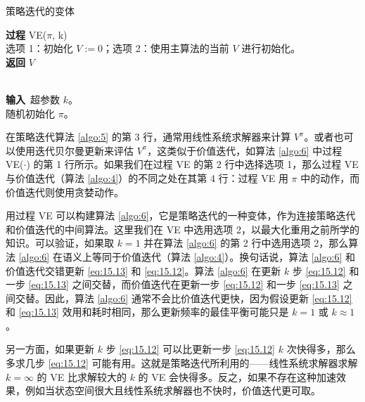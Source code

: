\vspace{0.5em}
\begin{algorithm}[H]
    \SetAlgoNoLine
    \label{algo:6}
    \caption{策略迭代的变体}
    \textbf{过程} VE($\pi$, k) \\
    \quad 选项 1：初始化 $V := 0$；选项 2：使用主算法的当前 $V$ 进行初始化。\\
    \quad {}
    \textbf{返回} $V$

    \ \\
    \textbf{输入}\ 超参数 $k$。\\
    随机初始化 $\pi$。\\
\end{algorithm}

在策略迭代算法 \ref{algo:5} 的第 3 行，通常用线性系统求解器来计算 $V^\pi$。或者也可以使用迭代贝尔曼更新来评估 $V^\pi$，这类似于价值迭代，如算法 \ref{algo:6} 中过程 VE($\cdot$) 的第 1 行所示。如果我们在过程 VE 的第 2 行中选择选项 1，那么过程 VE 与价值迭代（算法 \ref{algo:4}）的不同之处在其第 4 行：过程 VE 用 $\pi$ 中的动作，而价值迭代则使用贪婪动作。

用过程 VE 可以构建算法 \ref{algo:6}，它是策略迭代的一种变体，作为连接策略迭代和价值迭代的中间算法。这里我们在 VE 中选用选项 2，以最大化重用之前所学的知识。可以验证，如果取 $k=1$ 并在算法 \ref{algo:6} 的第 2 行中选用选项 2，那么算法 \ref{algo:6} 在语义上等同于价值迭代（算法 \ref{algo:4}）。换句话说，算法 \ref{algo:6} 和价值迭代交错更新 \eqref{eq:15.13} 和 \eqref{eq:15.12}。算法 \ref{algo:6} 在更新 $k$ 步 \eqref{eq:15.12} 和一步 \eqref{eq:15.13} 之间交替，而价值迭代在更新一步 \eqref{eq:15.12} 和一步 \eqref{eq:15.13} 之间交替。因此，算法 \ref{algo:6} 通常不会比价值迭代更快，因为假设更新 \eqref{eq:15.12} 和 \eqref{eq:15.13} 效用和耗时相同，那么更新频率的最佳平衡可能只是 $k=1$ 或 $k \approx 1$。

另一方面，如果更新 $k$ 步 \eqref{eq:15.12} 可以比更新一步 \eqref{eq:15.12} $k$ 次快得多，那么多求几步 \eqref{eq:15.12} 可能有用。这就是策略迭代所利用的——线性系统求解器求解 $k=\infty$ 的 VE 比求解较大的 $k$ 的 VE 会快得多。反之，如果不存在这种加速效果，例如当状态空间很大且线性系统求解器也不快时，价值迭代更可取。